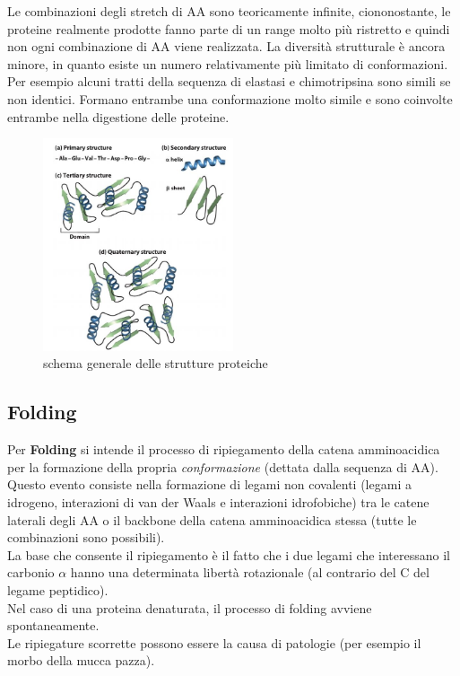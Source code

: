     Le combinazioni degli stretch di AA sono teoricamente infinite, ciononostante, le proteine realmente prodotte fanno parte di un range molto più ristretto e quindi non ogni combinazione di AA viene realizzata. La diversità strutturale è ancora minore, in quanto esiste un numero relativamente più limitato di conformazioni. 
    Per esempio alcuni tratti della sequenza di elastasi e chimotripsina sono simili se non identici. Formano entrambe una conformazione molto simile e sono coinvolte entrambe nella digestione delle proteine.
          \begin{figure}[h]
            \centering
            \includegraphics[width=0.5\textwidth]{images/proteinegerarchia.JPG}
            \caption{\small schema generale delle strutture proteiche}
            \label{fig:mesh1}
        \end{figure}
    
    \subsection{Folding}
        Per \textbf{Folding} si intende il processo di ripiegamento della catena amminoacidica per la formazione della propria \textit{conformazione} (dettata dalla sequenza di AA). 
        Questo evento consiste nella formazione di legami non covalenti (legami a idrogeno, interazioni di van der Waals e interazioni idrofobiche) tra le catene laterali degli AA o il backbone della catena amminoacidica stessa (tutte le combinazioni sono possibili).\\
        La base che consente il ripiegamento è il fatto che i due legami che interessano il carbonio $\alpha$ hanno una determinata libertà rotazionale (al contrario del C del legame peptidico).\\
        Nel caso di una proteina denaturata, il processo di folding avviene spontaneamente.\\
        Le ripiegature scorrette possono essere la causa di patologie (per esempio il morbo della mucca pazza).
